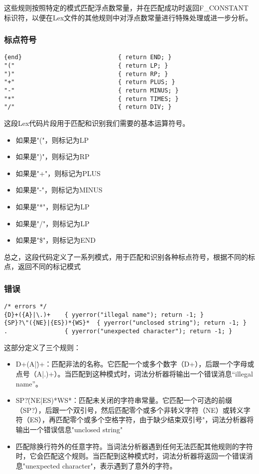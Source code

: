 \documentclass[lang=cn,11pt,a4paper]{elegantpaper}
\begin{document}
这些规则按照特定的模式匹配浮点数常量，并在匹配成功时返回F\_CONSTANT标识符，以便在Lex文件的其他规则中对浮点数常量进行特殊处理或进一步分析。

\subsubsection{标点符号}

\begin{lstlisting}
{end}                           { return END; }
"("                             { return LP; }
")"                             { return RP; }
"+"                             { return PLUS; }
"-"                             { return MINUS; }
"*"                             { return TIMES; }
"/"                             { return DIV; }
\end{lstlisting}

这段Lex代码片段用于匹配和识别我们需要的基本运算符号。

\begin{itemize}
    \item 如果是"("，则标记为LP
    \item 如果是")"，则标记为RP
    \item 如果是"+"，则标记为PLUS
    \item 如果是"-"，则标记为MINUS
    \item 如果是"*"，则标记为LP
    \item 如果是"/"，则标记为LP
    \item 如果是"\$"，则标记为END
\end{itemize}

总之，这段代码定义了一系列模式，用于匹配和识别各种标点符号，根据不同的标点，返回不同的标记模式

\subsubsection{错误}

\begin{lstlisting}
/* errors */
{D}+({A}|\.)+    { yyerror("illegal name"); return -1; } 
{SP}?\"({NE}|{ES})*{WS}*  { yyerror("unclosed string"); return -1; }
.	    		 { yyerror("unexpected character"); return -1; }
\end{lstlisting}

这部分定义了三个规则：
\begin{itemize}
    \item {D}+({A}|\.)+：匹配非法的名称。它匹配一个或多个数字（{D}+），后跟一个字母或点号（{A}|.)+）。当匹配到这种模式时，词法分析器将输出一个错误消息“illegal name”。
    \item {SP}?\"({NE}|{ES})*{WS}*：匹配未关闭的字符串常量。它匹配一个可选的前缀（{SP}?），后跟一个双引号，然后匹配零个或多个非转义字符（NE）或转义字符（ES），再匹配零个或多个空格字符，由于缺少结束双引号"，词法分析器将输出一个错误信息"unclosed string"
    \item 匹配除换行符外的任意字符。当词法分析器遇到任何无法匹配其他规则的字符时，它会匹配这个规则。当匹配到这种模式时，词法分析器将返回一个错误消息"unexpected character"，表示遇到了意外的字符。
\end{itemize}
\end{document}

